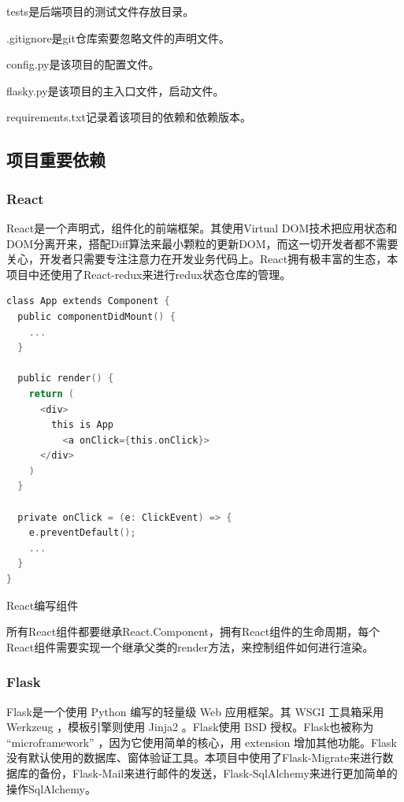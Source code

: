 tests是后端项目的测试文件存放目录。

.gitignore是git仓库索要忽略文件的声明文件。

config.py是该项目的配置文件。

flasky.py是该项目的主入口文件，启动文件。

requirements.txt记录着该项目的依赖和依赖版本。

\subsection{项目重要依赖}

\subsubsection{React}

React是一个声明式，组件化的前端框架。其使用Virtual DOM技术把应用状态和DOM分离开来，搭配Diff算法来最小颗粒的更新DOM，而这一切开发者都不需要关心，开发者只需要专注注意力在开发业务代码上。React拥有极丰富的生态，本项目中还使用了React-redux来进行redux状态仓库的管理。

\begin{lstlisting}[language=C]
class App extends Component {
  public componentDidMount() {
  	...
  }
  
  public render() {
	return (
	  <div>
	    this is App
	      <a onClick={this.onClick}>
	  </div>
	)
  }
	  
  private onClick = (e: ClickEvent) => {
    e.preventDefault();
    ...
  }
}
\end{lstlisting}

\begin{center}
	{\small React编写组件}
\end{center}

所有React组件都要继承React.Component，拥有React组件的生命周期，每个React组件需要实现一个继承父类的render方法，来控制组件如何进行渲染。

\subsubsection{Flask}

Flask是一个使用 Python 编写的轻量级 Web 应用框架。其 WSGI 工具箱采用 Werkzeug ，模板引擎则使用 Jinja2 。Flask使用 BSD 授权。Flask也被称为 “microframework” ，因为它使用简单的核心，用 extension 增加其他功能。Flask没有默认使用的数据库、窗体验证工具。本项目中使用了Flask-Migrate来进行数据库的备份，Flask-Mail来进行邮件的发送，Flask-SqlAlchemy来进行更加简单的操作SqlAlchemy。

